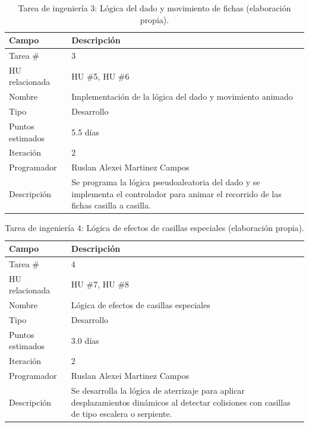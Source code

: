 \begin{table}[H]
\centering
\caption{Tarea de ingeniería 3: Lógica del dado y movimiento de fichas (elaboración propia).\label{tab:ti3}}
\begin{tabular}{|p{}|p{}|}
\hline
\textbf{Campo} & \textbf{Descripción} \\
\hline
Tarea \# & 3 \\
\hline
HU relacionada & HU \#5, HU \#6 \\
\hline
Nombre & Implementación de la lógica del dado y movimiento animado \\
\hline
Tipo & Desarrollo \\
\hline
Puntos estimados & 5.5 días \\
\hline
Iteración & 2 \\
\hline
Programador & Ruslan Alexei Martinez Campos \\
\hline
Descripción & Se programa la lógica pseudoaleatoria del dado y se implementa el controlador para animar el recorrido de las fichas casilla a casilla. \\
\hline
\end{tabular}
\end{table}

\begin{table}[H]
\centering
\caption{Tarea de ingeniería 4: Lógica de efectos de casillas especiales (elaboración propia).\label{tab:ti4}}
\begin{tabular}{|p{}|p{}|}
\hline
\textbf{Campo} & \textbf{Descripción} \\
\hline
Tarea \# & 4 \\
\hline
HU relacionada & HU \#7, HU \#8 \\
\hline
Nombre & Lógica de efectos de casillas especiales \\
\hline
Tipo & Desarrollo \\
\hline
Puntos estimados & 3.0 días \\
\hline
Iteración & 2 \\
\hline
Programador & Ruslan Alexei Martinez Campos \\
\hline
Descripción & Se desarrolla la lógica de aterrizaje para aplicar desplazamientos dinámicos al detectar colisiones con casillas de tipo escalera o serpiente. \\
\hline
\end{tabular}
\end{table}

